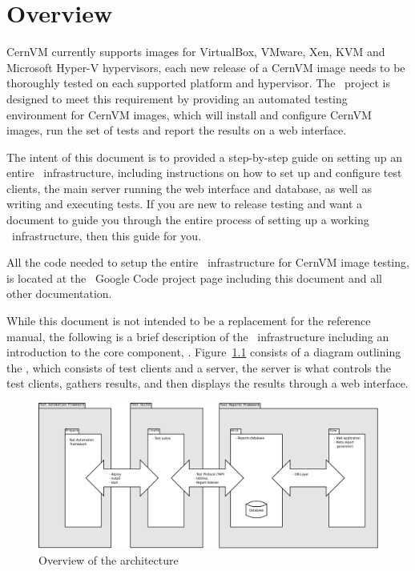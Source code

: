 \chapter{Overview}
\label{sct:overview}

CernVM currently supports images for VirtualBox, VMware, Xen, KVM and Microsoft Hyper-V hypervisors, each new release of a CernVM image needs to be 
thoroughly tested on each supported platform and hypervisor. The \cernvmreleasetesting\ project is designed to meet this requirement by providing an 
automated testing environment for CernVM images, which will install and configure CernVM images, run the set of tests and report the results on a web
interface.

The intent of this document is to provided a step-by-step guide on setting up an entire \cernvmreleasetesting\ infrastructure, including instructions
on how to set up and configure test clients, the main server running the web interface and database, as well as writing and executing tests. If you are
new to release testing and want a document to guide you through the entire process of setting up a working \cernvmreleasetesting\ infrastructure,
then this guide for you.

All the code needed to setup the entire \releasetesting\ infrastructure for CernVM image testing, is located at the 
\cernvmreleasetesting\ Google Code project page\cite{GCreleasetesting} including this document and all other documentation. 

While this document is not intended to be a replacement for the reference manual, the following is a brief description of the \releasetesting\ infrastructure 
including an introduction to the core component, \amdtapper\cite{tapper}. Figure~\ref{fig:architecture} consists of a diagram outlining the
, which consists of test clients and a server, the server is what controls the test clients, gathers 
results, and then displays the results through a web interface.\newline

\begin{figure}[!hbp]
	\begin{center}
		\includegraphics[scale=0.25]{img/tapper_architecture_overview.png}
	\end{center}
	\caption{Overview of the \tapper architecture}
	\label{fig:architecture}
\end{figure}

